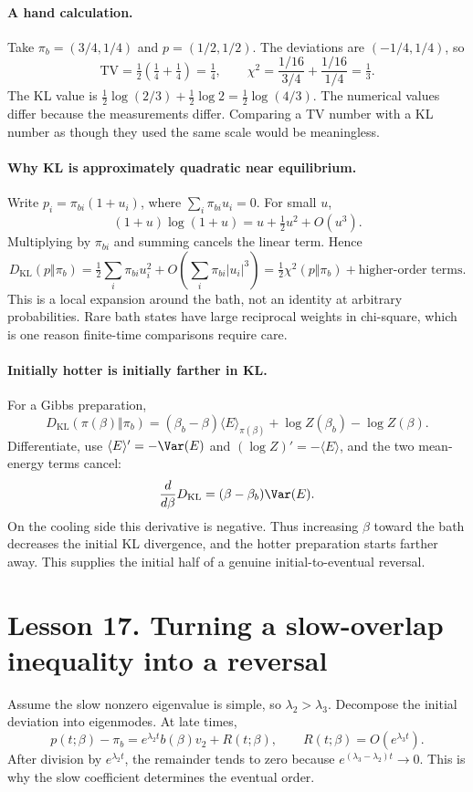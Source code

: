 \paragraph{A hand calculation.}
Take $\pi_b=(3/4,1/4)$ and $p=(1/2,1/2)$. The deviations are
$(-1/4,1/4)$, so
\[
\mathrm{TV}=\tfrac12(\tfrac14+\tfrac14)=\tfrac14,
\qquad
\chi^2=\frac{1/16}{3/4}+\frac{1/16}{1/4}=\tfrac13.
\]
The KL value is
$\frac12\log(2/3)+\frac12\log2=\frac12\log(4/3)$.
The numerical values differ because the measurements differ. Comparing a TV
number with a KL number as though they used the same scale would be meaningless.

\paragraph{Why KL is approximately quadratic near equilibrium.}
Write $p_i=\pi_{bi}(1+u_i)$, where $\sum_i\pi_{bi}u_i=0$.
For small $u$,
\[
(1+u)\log(1+u)=u+\tfrac12u^2+O(u^3).
\]
Multiplying by $\pi_{bi}$ and summing cancels the linear term. Hence
\[
D_{\mathrm{KL}}(p\Vert\pi_b)
=\tfrac12\sum_i\pi_{bi}u_i^2+O\!\left(\sum_i\pi_{bi}|u_i|^3\right)
=\tfrac12\chi^2(p\Vert\pi_b)+\text{higher-order terms}.
\]
This is a local expansion around the bath, not an identity at arbitrary
probabilities. Rare bath states have large reciprocal weights in chi-square,
which is one reason finite-time comparisons require care.

\paragraph{Initially hotter is initially farther in KL.}
For a Gibbs preparation,
\[
D_{\mathrm{KL}}(\pi(\beta)\Vert\pi_b)
=(\beta_b-\beta)\langle E\rangle_{\pi(\beta)}
+\log Z(\beta_b)-\log Z(\beta).
\]
Differentiate, use $\langle E\rangle'=-\Var(E)$ and
$(\log Z)'=-\langle E\rangle$, and the two mean-energy terms cancel:
\[
\frac{d}{d\beta}D_{\mathrm{KL}}=(\beta-\beta_b)\Var(E).
\]
On the cooling side this derivative is negative. Thus increasing $\beta$
toward the bath decreases the initial KL divergence, and the hotter
preparation starts farther away. This supplies the initial half of a genuine
initial-to-eventual reversal.

\clearpage
\section*{Lesson 17. Turning a slow-overlap inequality into a reversal}
Assume the slow nonzero eigenvalue is simple, so
$\lambda_2>\lambda_3$. Decompose the initial deviation into eigenmodes.
At late times,
\[
p(t;\beta)-\pi_b=e^{\lambda_2t}b(\beta)v_2+R(t;\beta),
\qquad R(t;\beta)=O(e^{\lambda_3t}).
\]
After division by $e^{\lambda_2t}$, the remainder tends to zero because
$e^{(\lambda_3-\lambda_2)t}\to0$. This is why the slow coefficient determines
the eventual order.

